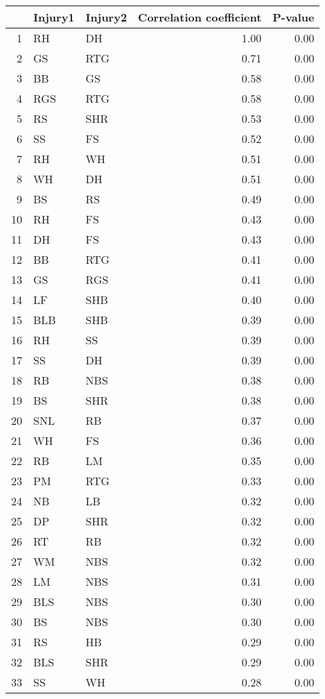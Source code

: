 \begin{table}[ht]
\centering
\begin{tabular}{rllrr}
  \hline
 & Injury1 & Injury2 & Correlation coefficient & P-value \\ 
  \hline
1 & RH & DH & 1.00 & 0.00 \\ 
  2 & GS & RTG & 0.71 & 0.00 \\ 
  3 & BB & GS & 0.58 & 0.00 \\ 
  4 & RGS & RTG & 0.58 & 0.00 \\ 
  5 & RS & SHR & 0.53 & 0.00 \\ 
  6 & SS & FS & 0.52 & 0.00 \\ 
  7 & RH & WH & 0.51 & 0.00 \\ 
  8 & WH & DH & 0.51 & 0.00 \\ 
  9 & BS & RS & 0.49 & 0.00 \\ 
  10 & RH & FS & 0.43 & 0.00 \\ 
  11 & DH & FS & 0.43 & 0.00 \\ 
  12 & BB & RTG & 0.41 & 0.00 \\ 
  13 & GS & RGS & 0.41 & 0.00 \\ 
  14 & LF & SHB & 0.40 & 0.00 \\ 
  15 & BLB & SHB & 0.39 & 0.00 \\ 
  16 & RH & SS & 0.39 & 0.00 \\ 
  17 & SS & DH & 0.39 & 0.00 \\ 
  18 & RB & NBS & 0.38 & 0.00 \\ 
  19 & BS & SHR & 0.38 & 0.00 \\ 
  20 & SNL & RB & 0.37 & 0.00 \\ 
  21 & WH & FS & 0.36 & 0.00 \\ 
  22 & RB & LM & 0.35 & 0.00 \\ 
  23 & PM & RTG & 0.33 & 0.00 \\ 
  24 & NB & LB & 0.32 & 0.00 \\ 
  25 & DP & SHR & 0.32 & 0.00 \\ 
  26 & RT & RB & 0.32 & 0.00 \\ 
  27 & WM & NBS & 0.32 & 0.00 \\ 
  28 & LM & NBS & 0.31 & 0.00 \\ 
  29 & BLS & NBS & 0.30 & 0.00 \\ 
  30 & BS & NBS & 0.30 & 0.00 \\ 
  31 & RS & HB & 0.29 & 0.00 \\ 
  32 & BLS & SHR & 0.29 & 0.00 \\ 
  33 & SS & WH & 0.28 & 0.00 \\ 

\end{tabular}
\end{table}
